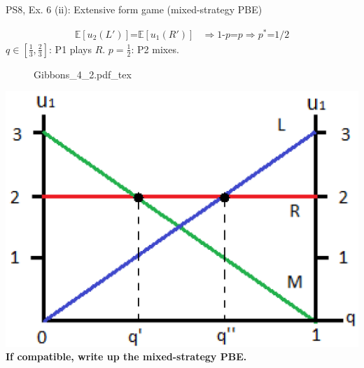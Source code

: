 \begin{frame}{PS8, Ex. 6 (ii): Extensive form game (mixed-strategy PBE)}
\begin{multicols}{2}
      \begin{align*}
        \mathbb{E}[u_2(L')]\text{=}\mathbb{E}[u_1(R')]&\Rightarrow \text{1-}p\text{=}p\Rightarrow p^*\text{=}1/2
      \end{align*}
      $q\in$$\left[\frac{1}{3},\frac{2}{3}\right]$: P1 plays $R$. $p=\frac{1}{2}$: P2 mixes.
      \vfill\null\columnbreak
      \begin{figure}[!h]
        \center {}
        {Gibbons_4_2.pdf_tex}
      \end{figure}
      \includegraphics[width=1.1\columnwidth]{figures/Gibbons_4_2_E[u]}
      \textbf{If compatible, write up the mixed-strategy PBE.}
      \vfill\null
    \end{multicols}
\end{frame}
